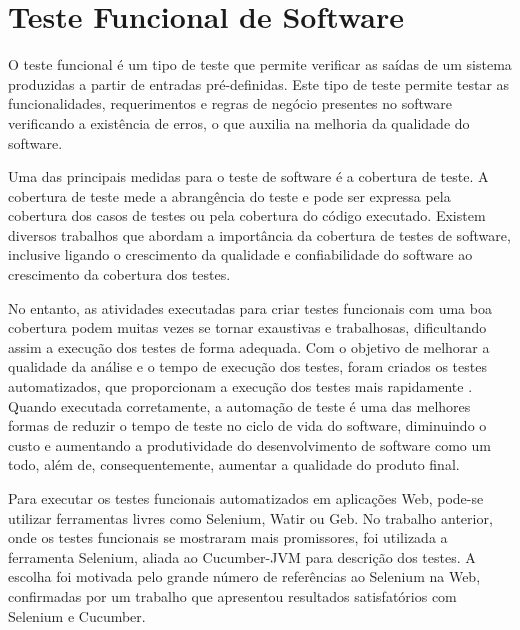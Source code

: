 \documentclass[12pt]{article}
\begin{document}
\section{Teste Funcional de Software}
O teste funcional é um tipo de teste que permite verificar as saídas de um sistema produzidas a partir de entradas pré-definidas. Este tipo de teste permite testar as funcionalidades, requerimentos e regras de negócio presentes no software\cite{molinari2003testes} verificando a existência de erros, o que auxilia na melhoria da qualidade do software.

Uma das principais medidas para o teste de software é a cobertura de teste. A cobertura de teste mede a abrangência do teste e pode ser expressa pela cobertura dos casos de testes ou pela cobertura do código executado. Existem diversos trabalhos que abordam a importância da cobertura de testes de software\cite{zhu1997software,bieman1996using}, inclusive ligando o crescimento da qualidade e confiabilidade do software ao crescimento da cobertura dos testes\cite{malaiya2002software}.


No entanto, as atividades executadas para criar testes funcionais com uma boa cobertura podem muitas vezes se tornar exaustivas e trabalhosas, dificultando assim a execução dos testes de forma adequada. Com o objetivo de melhorar a qualidade da análise e o tempo de execução dos testes, foram criados os testes automatizados, que proporcionam a execução dos testes mais rapidamente \cite{fantinato2005autotest}. Quando executada corretamente, a automação de teste é uma das melhores formas de reduzir o tempo de teste no ciclo de vida do software, diminuindo o custo e aumentando a produtividade do desenvolvimento de software como um todo, além de, consequentemente, aumentar a qualidade do produto final.

Para executar os testes funcionais automatizados em aplicações Web, pode-se utilizar ferramentas livres como Selenium\cite{selenium}, Watir\cite{watir} ou Geb\cite{geb}. No trabalho anterior\cite{sbqs2015}, onde os testes funcionais se mostraram mais promissores, foi utilizada a ferramenta Selenium, aliada ao Cucumber-JVM\cite{cucumber} para descrição dos testes. A escolha foi motivada pelo grande número de referências ao Selenium na Web, confirmadas por um trabalho que apresentou resultados satisfatórios com Selenium e Cucumber\cite{pannutest,sbqs2013}.
\end{document}
